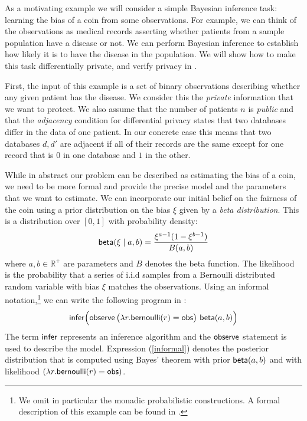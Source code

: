 \documentclass{sig-alternate-05-2015}
\theoremstyle{plain}
\theoremstyle{definition}
\theoremstyle{corollary}
\def\R{\mathbb{R}}
\newcommand{\rplus}{\R^+}
\begin{document}
As a motivating example we will consider a simple Bayesian inference task:
learning the bias of a coin from some observations. For example, we can think of
the observations as medical records asserting whether patients from a sample
population have a disease or not. We can perform Bayesian inference to establish
how likely it is to have the disease in the population. We will show how to make
this task differentially private, and verify privacy in \THESYSTEM. 

First, the input of this example is a set of binary observations
describing whether any given patient has the disease. We consider this
the \emph{private} information that we want to protect. We also assume that
the number of patients $n$ is \emph{public} and that the \emph{adjacency} condition
for differential privacy states that two databases
differ in the data of one patient. In our concrete case this means
that two databases $d,d'$ are adjacent if all of their records are
the same except for  one record that is $0$ in one database and $1$
in the other.

While in abstract our problem can be described as estimating the bias of a coin,
we need to be more formal and provide the precise model and the parameters that
we want to estimate. We can incorporate our initial belief on the fairness of
the coin using a prior distribution on the bias $\xi$ given by a \emph{beta
  distribution}. This is a distribution over $[0,1]$ with probability density:
$$
{\sf beta}(\xi \mid a,b)=\frac{\xi^{a-1}(1-\xi^{b-1})}{B(a,b)}
$$
where $a,b\in \rplus$ are parameters and $B$ denotes the beta function. The likelihood is the
probability that a series of i.i.d samples from a Bernoulli distributed random variable with
bias $\xi$ matches the observations.
Using an informal
notation,\footnote{We omit in particular the monadic probabilistic
  constructions. A formal description of this example can be found in
  .} we can write the following program in \THESYSTEM:
\begin{align}
{\sf infer}\Big ( {\sf observe}\, \big (\lambda r. {\sf bernoulli}(r)={\sf
  obs}\big )\ {\sf beta}(a,b)\Big )
\label{informal}
\end{align}
The term $\sf infer$ represents an inference
algorithm and the ${\sf observe}$  statement is used to describe the
model. Expression (\ref{informal}) denotes the posterior distribution that is computed using
Bayes' theorem with prior ${\sf beta}(a,b)$ and with
likelihood $(\lambda r. {\sf bernoulli}(r)={\sf obs})$.
\end{document}
